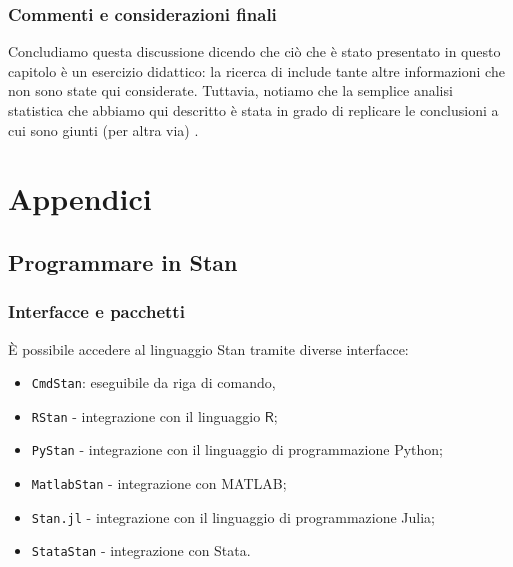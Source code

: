 \documentclass[
  11pt,
]{krantz}
\providecommand{\tightlist}{%
  \setlength{\itemsep}{0pt}\setlength{\parskip}{0pt}}
\newcommand{\R}{\textsf{R}} %
\theoremstyle{definition}
\theoremstyle{definition}
\theoremstyle{definition}
\theoremstyle{definition}
\theoremstyle{remark}
\begin{document}
\hypertarget{commenti-e-considerazioni-finali-1}{%
\section*{Commenti e considerazioni finali}\label{commenti-e-considerazioni-finali-1}}


Concludiamo questa discussione dicendo che ciò che è stato presentato in questo capitolo è un esercizio didattico: la ricerca di \citet{Gautret_2020} include tante altre informazioni che non sono state qui considerate. Tuttavia, notiamo che la semplice analisi statistica che abbiamo qui descritto è stata in grado di replicare le conclusioni a cui sono giunti (per altra via) \citet{Hulme_2020}.

\mainmatter

\hypertarget{part-appendici}{%
\part{Appendici}\label{part-appendici}}

\hypertarget{appendix-appendici}{%
\appendix {}}


\hypertarget{appendix:intro-stan}{%
\chapter{Programmare in Stan}\label{appendix:intro-stan}}

\hypertarget{interfacce-e-pacchetti}{%
\section{Interfacce e pacchetti}\label{interfacce-e-pacchetti}}

È possibile accedere al linguaggio Stan tramite diverse interfacce:

\begin{itemize}
\tightlist
\item
  \texttt{CmdStan}: eseguibile da riga di comando,
\item
  \texttt{RStan} - integrazione con il linguaggio \(\R\);
\item
  \texttt{PyStan} - integrazione con il linguaggio di programmazione Python;
\item
  \texttt{MatlabStan} - integrazione con MATLAB;
\item
  \texttt{Stan.jl} - integrazione con il linguaggio di programmazione Julia;
\item
  \texttt{StataStan} - integrazione con Stata.
\end{itemize}
\end{document}
